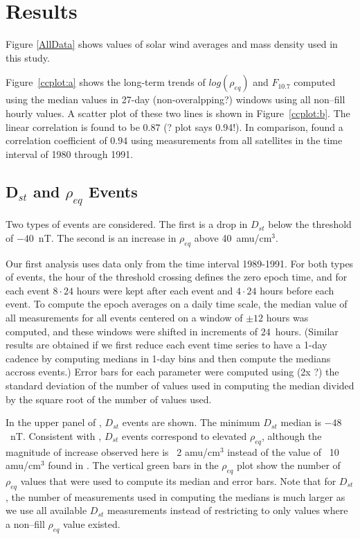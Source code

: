 \documentclass[10pt,twocolumn]{article}
\begin{document}

\section{Results}
Figure \ref{AllData} shows values of solar wind averages and mass density used in this study.  

Figure~\ref{ccplot:a} shows the long-term trends of $log(\rho_{eq})$ and $F_{10.7}$ computed using the median values in 27-day (non-overalpping?) windows using all non--fill hourly values.  A scatter plot of these two lines is shown in Figure~\ref{ccplot:b}.  The linear correlation is found to be $0.87$ (? plot says 0.94!).  In comparison, \cite{Takahashi2010} found a correlation coefficient of $0.94$ using measurements from all satellites in the time interval of 1980 through 1991.

\subsection{D$_{st}$ and $\rho_{eq}$ Events}

Two types of events are considered. The first is a drop in $D_{st}$ below the threshold of $-40$~nT.  The second is an increase in $\rho_{eq}$ above 40~amu/cm$^3$.

Our first analysis uses data only from the time interval 1989-1991. For both types of events, the hour of the threshold crossing defines the zero epoch time, and for each event $8\cdot24$ hours were kept after each event and $4\cdot24$ hours before each event.  To compute the epoch averages on a daily time scale, the median value of all measurements for all events centered on a window of $\pm 12$ hours was computed, and these windows were shifted in increments of $24$~hours. (Similar results are obtained if we first reduce each event time series to have a 1-day cadence by computing medians in 1-day bins and then compute the medians accross events.)  Error bars for each parameter were computed using (2x ?) the standard deviation of the number of values used in computing the median divided by the square root of the number of values used.

In the upper panel of \label{DailyAverages}, $D_{st}$ events are shown.  The minimum $D_{st}$ median is $-48$~nT.  Consistent with \cite{Takahashi2010}, $D_{st}$ events correspond to elevated $\rho_{eq}$, although the magnitude of increase observed here is ~2 amu/cm$^3$ instead of the value of ~10 amu/cm$^3$ found in \cite{Takahashi2010}.  The vertical green bars in the $\rho_{eq}$ plot show the number of $\rho_{eq}$ values that were used to compute its median and error bars.  Note that for $D_{st}$, the number of measurements used in computing the medians is much larger as we use all available $D_{st}$ measurements instead of restricting to only values where a non--fill $\rho_{eq}$ value existed.  
\end{document}
